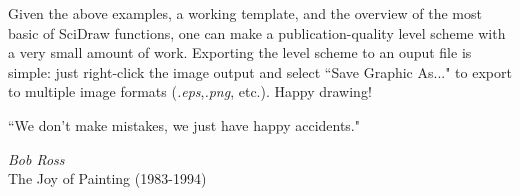 \documentclass[portrait,10pt]{article}
\begin{document}
Given the above examples, a working template, and the overview of the most basic of SciDraw functions, one can make a publication-quality level scheme with a very small amount of work. Exporting the level scheme to an ouput file is simple: just right-click the image output and select ``Save Graphic As..." to export to multiple image formats (\textit{.eps},\textit{.png}, etc.). Happy drawing!

\epigraph{``We don't make mistakes, we just have happy accidents."}{\textit{Bob Ross}\\The Joy of Painting (1983-1994)}

\end{document}
